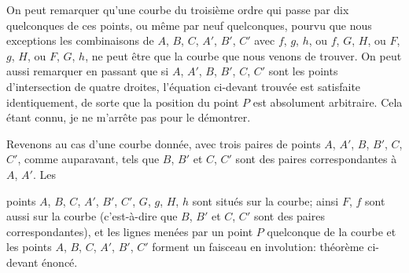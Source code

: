 \documentclass[12pt,a4paper]{article}
\begin{document}
On peut remarquer qu'une courbe du troisi\`eme ordre qui passe par dix quelconques de ces points, ou m\^eme par neuf quelconques, pourvu que nous exceptions les combinaisons de $A$, $B$, $C$, $A'$, $B'$, $C'$ avec $f$, $g$, $h$, ou $f$, $G$, $H$, ou $F$, $g$, $H$, ou $F$, $G$, $h$, ne peut \^etre que la courbe que nous venons de trouver. On peut aussi remarquer en passant que si $A$, $A'$, $B$, $B'$, $C$, $C'$ sont les points d'intersection de quatre droites, l'\'equation ci-devant trouv\'ee est satisfaite identiquement, de sorte que la position du point $P$ est absolument arbitraire. Cela \'etant connu, je ne m'arr\^ete pas pour le d\'emontrer.

Revenons au cas d'une courbe donn\'ee, avec trois paires de points $A$, $A'$, $B$, $B'$, $C$, $C'$, comme auparavant, tels que $B$, $B'$ et $C$, $C'$ sont des paires correspondantes \`a $A$, $A'$. Les

\newpage
\setcounter{page}{186}

points $A$, $B$, $C$, $A'$, $B'$, $C'$, $G$, $g$, $H$, $h$ sont situ\'es sur la courbe; ainsi $F$, $f$ sont aussi sur la courbe (c'est-\`a-dire que $B$, $B'$ et $C$, $C'$ sont des paires correspondantes), et les lignes men\'ees par un point $P$ quelconque de la courbe et les points $A$, $B$, $C$, $A'$, $B'$, $C'$ forment un faisceau en involution: th\'eor\`eme ci-devant \'enonc\'e.
\end{document}
